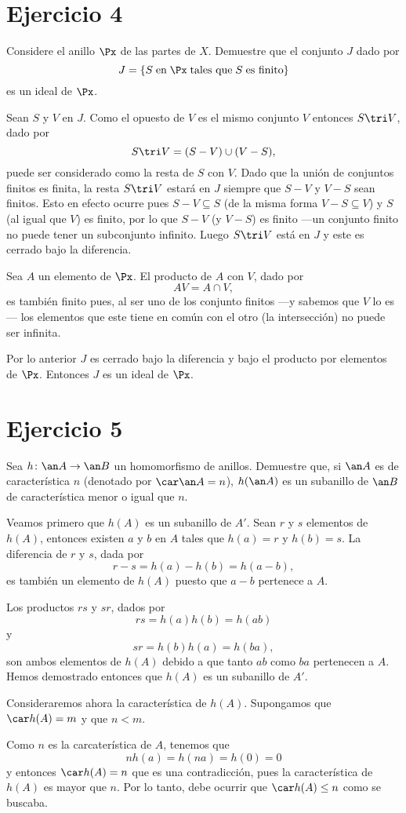 \documentclass[twocolumn,tarea]{customclass}
\begin{document}
\section*{Ejercicio 4}
	Considere el anillo $\Px$ de las partes de $X$. Demuestre que el conjunto $J$ dado por
\[ J = \{ S \; \text{en} \; \Px \;\text{tales que}\; S \; \text{es finito} \} \]
es un ideal de $\Px$.
\begin{sol}
	Sean $S$ y $V$ en $J$. Como el opuesto de $V$ es el mismo conjunto $V$ entonces $S \tri V$, dado por 
	\[ S\tri V = (S-V) \cup (V-S), \]
	puede ser considerado como la resta de $S$ con $V$. Dado que la unión de conjuntos finitos es finita, la resta $S\tri V$ estará en $J$ siempre que $S-V$ y $V-S$ sean finitos. Esto en efecto ocurre pues $S-V \subseteq S$ (de la misma forma $V-S\subseteq V$) y $S$ (al igual que $V$) es finito, por lo que $S-V$ (y $V-S$) es finito ---un conjunto finito no puede tener un subconjunto infinito. Luego $S\tri V$ está en $J$ y este es cerrado bajo la diferencia.
	
	Sea $A$ un elemento de $\Px$. El producto de $A$ con $V$, dado por
	\[ AV = A\cap V, \]
	es también finito pues, al ser uno de los conjunto finitos ---y sabemos que $V$ lo es--- los elementos que este tiene en común con el otro (la intersección) no puede ser infinita.
	
	Por lo anterior $J$ es cerrado bajo la diferencia y bajo el producto por elementos de $\Px$. Entonces $J$ es un ideal de $\Px$.
\end{sol}
\section*{Ejercicio 5}
	Sea $h\colon\an A\to\an B$ un homomorfismo de anillos. Demuestre que, si $\an A$ es de característica $n$ (denotado por $\car\an A = n$), $h(\an A)$ es un subanillo de $\an B$ de característica menor o igual que $n$.
\begin{sol}
	Veamos primero que $h(A)$ es un subanillo de $A'$. Sean $r$ y $s$ elementos de $h(A)$, entonces existen $a$ y $b$ en $A$ tales que $h(a)=r$ y $h(b)=s$. La diferencia de $r$ y $s$, dada por
	\[ r-s = h(a) - h(b) = h(a-b), \]
	es también un elemento de $h(A)$ puesto que $a-b$ pertenece a $A$.
	
	Los productos $rs$ y $sr$, dados por
	\[ rs = h(a)h(b) = h(ab) \]
	y
	\[ sr = h(b)h(a) = h(ba), \]
	son ambos elementos de $h(A)$ debido a que tanto $ab$ como $ba$ pertenecen a $A$. Hemos demostrado entonces que $h(A)$ es un subanillo de $A'$.
	
	Consideraremos ahora la característica de $h(A)$. Supongamos que $\car h(A) = m$ y que $n < m$.
	
	Como $n$ es la carcaterística de $A$, tenemos que
	\[ nh(a) = h(na) = h(0) = 0 \]
	y entonces $\car h(A) = n$ que es una contradicción, pues la característica de $h(A)$ es mayor que $n$. Por lo tanto, debe ocurrir que $\car h(A) \leq n$ como se buscaba. 
\end{sol}
\end{document}
